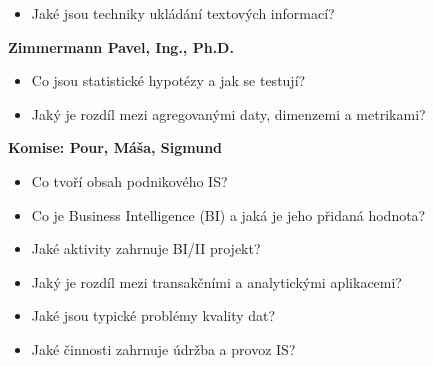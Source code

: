 \begin{profesorbox}
\begin{itemize}
  \item Jaké jsou techniky ukládání textových informací?
\end{itemize}
\textbf{Zimmermann Pavel, Ing., Ph.D.}
\begin{itemize}
  \item Co jsou statistické hypotézy a jak se testují?
  \item Jaký je rozdíl mezi agregovanými daty, dimenzemi a metrikami?
\end{itemize}
\textbf{Komise: Pour, Máša, Sigmund}
\begin{itemize}
  \item Co tvoří obsah podnikového IS?
  \item Co je Business Intelligence (BI) a jaká je jeho přidaná hodnota?
  \item Jaké aktivity zahrnuje BI/II projekt?
  \item Jaký je rozdíl mezi transakčními a analytickými aplikacemi?
  \item Jaké jsou typické problémy kvality dat?
  \item Jaké činnosti zahrnuje údržba a provoz IS?
\end{itemize}
\end{profesorbox}

